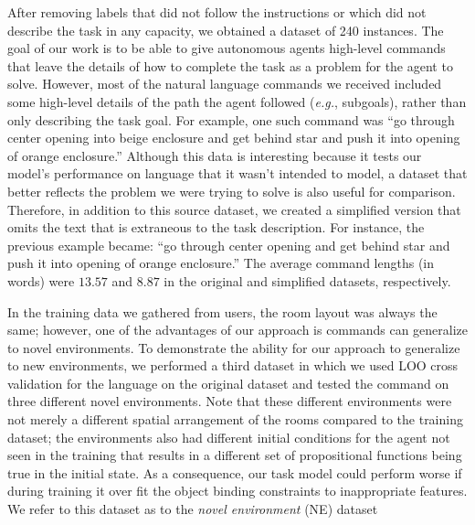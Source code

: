 \documentclass[conference]{IEEEtran}
\begin{document}
After removing labels that did not follow the instructions or which did not describe the task in any capacity, we obtained a dataset of 240 instances. The goal of our work is to be able to give autonomous agents high-level commands that leave the details of how to complete the task as a problem for the agent to solve. However, most of the natural language commands we received included some high-level details of the path the agent followed (\emph{e.g.}, subgoals), rather than only describing the task goal. 
For example, one such command was ``go through center opening into beige enclosure and get behind star and push it into opening of orange enclosure.'' 
Although this data is interesting because it tests our model's performance on language that it wasn't intended to model, a dataset that better reflects the problem we were trying to solve is also useful for comparison. Therefore, in addition to this source dataset, we  created a simplified version that omits the text that is extraneous to the task description. 
For instance, the previous example became: ``go through center opening and get behind star and push it into opening of orange enclosure.'' 
The average command lengths (in words) were $13.57$ and $8.87$ in the original and simplified datasets, respectively.

In the training data we gathered from users, the room layout was always the same; however, one of the advantages of our approach is commands can generalize to novel environments. To demonstrate the ability for our approach to generalize to new environments, we performed a third dataset in which we used LOO cross validation for the language on the original dataset and tested the command on three different novel environments. Note that these different environments were not merely a different spatial arrangement of the rooms compared to the training dataset; the environments also had different initial conditions for the agent not seen in the training that results in a different set of propositional functions being true in the initial state. As a consequence, our task model could perform worse if during training it over fit the object binding constraints to inappropriate features. We refer to this dataset as to the {\em novel environment} (NE) dataset


\end{document}
